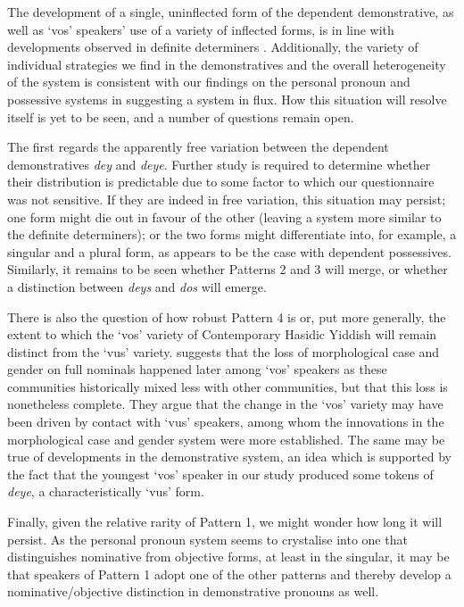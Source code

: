 \documentclass[output=paper, hidelinks]{langscibook}
\begin{document}
The development of a single, uninflected form of the dependent demonstrative, as well as `vos' speakers' use of a variety of inflected forms, is in line with developments observed in definite determiners \citep{Author20, Author21}. Additionally, the variety of individual strategies we find in the demonstratives and the overall heterogeneity of the system is consistent with our findings on the personal pronoun and possessive systems in suggesting a system in flux. How this situation will resolve itself is yet to be seen, and a number of questions remain open.

The first regards the apparently free variation between the dependent demonstratives \textit{dey} and \textit{deye}. Further study is required to determine whether their distribution is predictable due to some factor to which our questionnaire was not sensitive. If they are indeed in free variation, this situation may persist; one form might die out in favour of the other (leaving a system more similar to the definite determiners); or the two forms might differentiate into, for example, a singular and a plural form, as appears to be the case with dependent possessives. Similarly, it remains to be seen whether Patterns 2 and 3 will merge, or whether a distinction between \textit{deys} and \textit{dos} will emerge. 

There is also the question of how robust Pattern 4 is or, put more generally, the extent to which the `vos' variety of Contemporary Hasidic Yiddish will remain distinct from the `vus' variety. \citet{Author21} suggests that the loss of morphological case and gender on full nominals happened later among `vos' speakers as these communities historically mixed less with other communities, but that this loss is nonetheless complete. They argue that the change in the `vos' variety may have been driven by contact with `vus' speakers, among whom the innovations in the morphological case and gender system were more established. The same may be true of developments in the demonstrative system, an idea which is supported by the fact that the youngest `vos' speaker in our study produced some tokens of \textit{deye}, a characteristically `vus' form. 

Finally, given the relative rarity of Pattern 1, we might wonder how long it will persist. As the personal pronoun system seems to crystalise into one that distinguishes nominative from objective forms, at least in the singular, it may be that speakers of Pattern 1 adopt one of the other patterns and thereby develop a nominative/objective distinction in demonstrative pronouns as well. 
\end{document}
